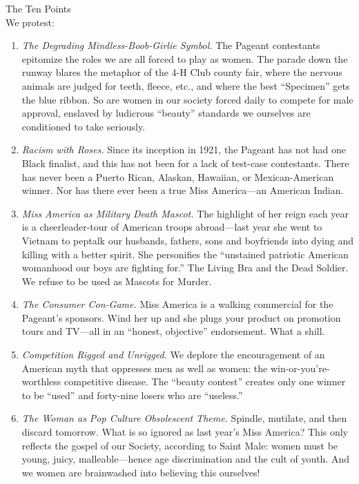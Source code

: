 \documentclass{article}
\begin{document}
The Ten Points\\
We protest:

\begin{enumerate}
	\item \textit{The Degrading Mindless-Boob-Girlie Symbol.} The Pageant
		contestants epitomize the roles we are all forced to play as women. The
		parade down the runway blares the metaphor of the 4-H Club county fair,
		where the nervous animals are judged for teeth, fleece, etc., and where
		the best ``Specimen'' gets the blue ribbon. So are women in our society
		forced daily to compete for male approval, enslaved by ludicrous
		``beauty'' standards we ourselves are conditioned to take seriously.

	\item \textit{Racism with Roses.} Since its inception in 1921, the Pageant
		has not had one Black finalist, and this has not been for a lack of
		test-case contestants. There has never been a Puerto Rican, Alaskan,
		Hawaiian, or Mexican-American winner. Nor has there ever been a true
		Miss America---an American Indian.

	\item \textit{Miss America as Military Death Mascot.} The highlight of her
		reign each year is a cheerleader-tour of American troops abroad---last
		year she went to Vietnam to peptalk our husbands, fathers, sons and
		boyfriends into dying and killing with a better spirit. She personifies
		the ``unstained patriotic American womanhood our boys are fighting
		for.'' The Living Bra and the Dead Soldier. We refuse to be used as
		Mascots for Murder.

	\item \textit{The Consumer Con-Game.} Miss America is a walking commercial
		for the Pageant's sponsors. Wind her up and she plugs your product on
		promotion tours and TV---all in an ``honest, objective'' endorsement.
		What a shill.

	\item \textit{Competition Rigged and Unrigged.} We deplore the
		encouragement of an American myth that oppresses men as well as women:
		the win-or-you’re-worthless competitive disease. The ``beauty contest''
		creates only one winner to be ``used'' and forty-nine losers who are
		``useless.''

	\item \textit{The Woman as Pop Culture Obsolescent Theme.} Spindle,
		mutilate, and then discard tomorrow. What is so ignored as last year's
		Miss America? This only reflects the gospel of our Society, according
		to Saint Male: women must be young, juicy, malleable---hence age
		discrimination and the cult of youth. And we women are brainwashed into
		believing this ourselves!


\end{enumerate}
\end{document}
